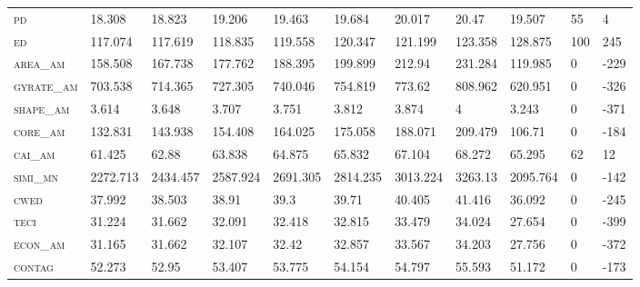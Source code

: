 \begin{landscape}
\begin{table}[!htbp]
\begin{tabular}{@{}llllllll|lll@{}}
\small \textsc{pd}              & 18.308       & 18.823      & 19.206        & 19.463       & 19.684        & 20.017        & 20.47         & 19.507      & 55     & 4    \\
\small \textsc{ed}              & 117.074       & 117.619      & 118.835        & 119.558       & 120.347        & 121.199        & 123.358         & 128.875      & 100     & 245    \\
\small \textsc{area\_am}        & 158.508       & 167.738      & 177.762        & 188.395       & 199.899        & 212.94        & 231.284         & 119.985      & 0     & -229     \\
\small \textsc{gyrate\_am}      & 703.538       & 714.365      & 727.305        & 740.046       & 754.819        & 773.62        & 808.962         & 620.951      & 0     & -326     \\
\small \textsc{shape\_am}       & 3.614       & 3.648      & 3.707        & 3.751       & 3.812        & 3.874        & 4         & 3.243      & 0     & -371     \\
\small \textsc{core\_am}        & 132.831       & 143.938      & 154.408        & 164.025       & 175.058        & 188.071        & 209.479         & 106.71      & 0     & -184     \\
\small \textsc{cai\_am}         & 61.425       & 62.88      & 63.838        & 64.875       & 65.832        & 67.104        & 68.272         & 65.295      & 62     & 12   \\
\small \textsc{simi\_mn}        & 2272.713       & 2434.457      & 2587.924        & 2691.305       & 2814.235        & 3013.224        & 3263.13         & 2095.764      & 0     & -142     \\
\small \textsc{cwed}            & 37.992       & 38.503      & 38.91        & 39.3       & 39.71        & 40.405        & 41.416         & 36.092      & 0     & -245     \\
\small \textsc{teci}            & 31.224       & 31.662      & 32.091        & 32.418       & 32.815        & 33.479        & 34.024         & 27.654      & 0     & -399     \\
\small \textsc{econ\_am}        & 31.165       & 31.662      & 32.107        & 32.42       & 32.857        & 33.567        & 34.203         & 27.756      & 0     & -372     \\
\small \textsc{contag}          & 52.273       & 52.95      & 53.407        & 53.775       & 54.154        & 54.797        & 55.593         & 51.172      & 0     & -173     \\

\end{tabular}
\end{table}
\end{landscape}
